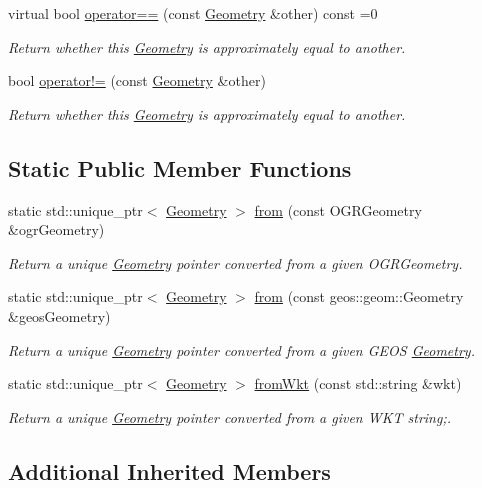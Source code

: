 \begin{DoxyCompactItemize}
virtual bool \hyperlink{group___geometry_module_gaf5b2bf20a71a57cc068e1e3ee78053f8}{operator==} (const \hyperlink{structdg_1_1deepcore_1_1geometry_1_1_geometry}{Geometry} \&other) const =0
\begin{DoxyCompactList}\small\item\em Return whether this \hyperlink{structdg_1_1deepcore_1_1geometry_1_1_geometry}{Geometry} is approximately equal to another. \end{DoxyCompactList}\item 
bool \hyperlink{group___geometry_module_gaf79f2d28ef2c5eae4f3893f82a2dee15}{operator!=} (const \hyperlink{structdg_1_1deepcore_1_1geometry_1_1_geometry}{Geometry} \&other)
\begin{DoxyCompactList}\small\item\em Return whether this \hyperlink{structdg_1_1deepcore_1_1geometry_1_1_geometry}{Geometry} is approximately equal to another. \end{DoxyCompactList}\end{DoxyCompactItemize}
\subsection*{Static Public Member Functions}
\begin{DoxyCompactItemize}
\item 
static std\+::unique\+\_\+ptr$<$ \hyperlink{structdg_1_1deepcore_1_1geometry_1_1_geometry}{Geometry} $>$ \hyperlink{group___geometry_module_ga6113cd54eece79c59ef04c86847a5f33}{from} (const O\+G\+R\+Geometry \&ogr\+Geometry)
\begin{DoxyCompactList}\small\item\em Return a unique \hyperlink{structdg_1_1deepcore_1_1geometry_1_1_geometry}{Geometry} pointer converted from a given O\+G\+R\+Geometry. \end{DoxyCompactList}\item 
static std\+::unique\+\_\+ptr$<$ \hyperlink{structdg_1_1deepcore_1_1geometry_1_1_geometry}{Geometry} $>$ \hyperlink{group___geometry_module_gae52dfa89bd864797db772a72c7eac37b}{from} (const geos\+::geom\+::\+Geometry \&geos\+Geometry)
\begin{DoxyCompactList}\small\item\em Return a unique \hyperlink{structdg_1_1deepcore_1_1geometry_1_1_geometry}{Geometry} pointer converted from a given G\+E\+OS \hyperlink{structdg_1_1deepcore_1_1geometry_1_1_geometry}{Geometry}. \end{DoxyCompactList}\item 
static std\+::unique\+\_\+ptr$<$ \hyperlink{structdg_1_1deepcore_1_1geometry_1_1_geometry}{Geometry} $>$ \hyperlink{group___geometry_module_ga09f1518844b80c4135bfb7f47a227464}{from\+Wkt} (const std\+::string \&wkt)
\begin{DoxyCompactList}\small\item\em Return a unique \hyperlink{structdg_1_1deepcore_1_1geometry_1_1_geometry}{Geometry} pointer converted from a given W\+KT string;. \end{DoxyCompactList}\end{DoxyCompactItemize}
\subsection*{Additional Inherited Members}
